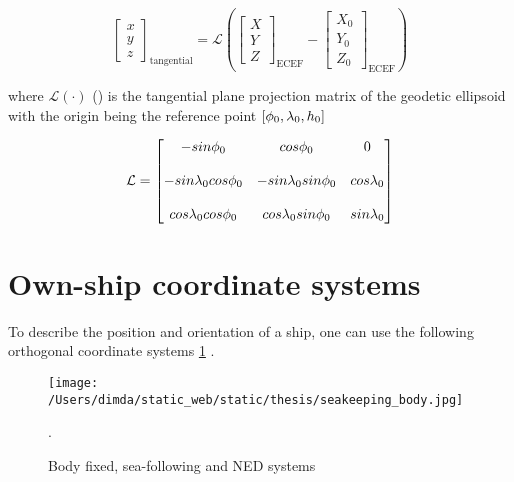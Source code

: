 \begin{equation} \label{eq:transformation_ECEF2ENU}
	\begin{bmatrix}
		x\\
		y\\
		z
	\end{bmatrix}_{\text{tangential}}= \mathcal{L}\left(\begin{bmatrix}
		X\\
		Y\\
		Z
	\end{bmatrix}_{\text{ECEF}} - \begin{bmatrix}
		X_0\\
		Y_0\\
		Z_0
	\end{bmatrix}_{\text{ECEF}}\right)
\end{equation}


where $\mathcal{L}(\cdot)$ () is the tangential plane projection matrix of the geodetic ellipsoid with the origin being the reference point $[{\phi}_0,{\lambda}_0,h_0]$ 




\begin{equation} \label{eq:Lambda}
\mathcal{L} = \begin{bmatrix}
-sin{\phi}_0  & cos{\phi}_0 & 0 \\\\
-sin{\lambda}_0cos{\phi}_0 & -sin{\lambda}_0sin{\phi}_0 & cos{\lambda}_0\\\\
cos{\lambda}_0 cos{\phi}_0 & cos{\lambda}_0 sin{\phi}_0 & sin{\lambda}_0
\end{bmatrix}
\end{equation}

\section{Own-ship coordinate systems}



To describe the position and orientation of a ship, one can use the following orthogonal coordinate systems  \cref{fig:ownship_frames} \cite{Perez2007} .


\begin{figure}[H] 	
	\centering
	\texttt{[image: /Users/dimda/static\_web/static/thesis/seakeeping\_body.jpg]}
	\caption{Body fixed, sea-following and NED systems \cite{Perez2007}}.
	\label{fig:ownship_frames}	
\end{figure}

